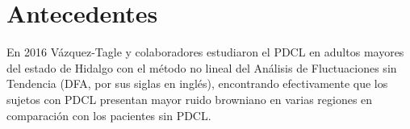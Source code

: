 %
%


\section*{Antecedentes}

En 2016 Vázquez-Tagle y colaboradores estudiaron el PDCL en adultos mayores del estado de Hidalgo con el método no lineal del Análisis de Fluctuaciones sin Tendencia (DFA, por sus siglas en inglés), encontrando efectivamente que los sujetos con PDCL presentan mayor ruido browniano en varias regiones en comparación con los pacientes sin PDCL\cite{VazquezTagle16}.
%

